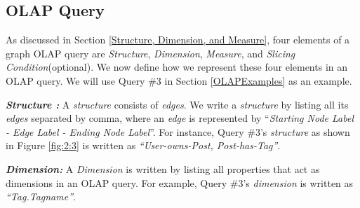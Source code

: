 %
%
%
%
%
%
%

\subsection{OLAP Query}

As discussed in Section \ref{Structure, Dimension, and Measure}, four elements of a graph OLAP query are \textit{Structure}, \textit{Dimension}, \textit{Measure}, and \textit{Slicing Condition}(optional). We now define how we represent these four elements in an OLAP query. We will use Query \#3 in Section \ref{OLAPExamples} as an example.

\noindent\textbf{\textit{Structure :}} A \textit{structure} consists of \textit{edges}. We write a \textit{structure} by listing all its \textit{edges} separated by comma, where an \textit{edge} is represented by ``\textit{Starting Node Label - Edge Label - Ending Node Label}''. For instance, Query \#3's \textit{structure} as shown in Figure \ref{fig:2:3} is written as \textit{``User-owns-Post, Post-has-Tag''}.



\noindent\textbf{\textit{Dimension:}} A
\textit{Dimension} is written by listing all properties that act as dimensions in an OLAP query. For example, Query \#3's \textit{dimension} is written as \textit{``Tag.Tagname''}.


